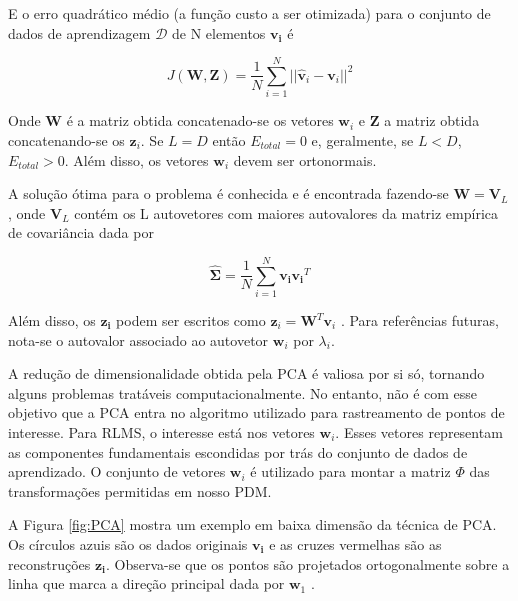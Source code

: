 {E o erro quadrático médio (a função custo a ser otimizada) para o conjunto de dados de aprendizagem $\mathcal{D}$ de N elementos $\mathbf{v_i}$ é

\begin{equation}
J(\mathbf{W}, \mathbf{Z} ) = \frac{1}{N}\sum_{i=1}^N ||\mathbf{\hat{v}}_{i} - \mathbf{v}_i||^2
\end{equation}

Onde $\mathbf{W}$ é a matriz obtida concatenado-se os vetores $\mathbf{w}_i$ e $\mathbf{Z}$ a matriz obtida concatenando-se os $\mathbf{z}_i$. Se $L = D$ então $E_{total} = 0$ e, geralmente, se $L < D$, $E_{total} > 0$.  Além disso, os vetores $\mathbf{w}_i$ devem ser ortonormais.

A solução ótima para o problema é conhecida e é encontrada fazendo-se $\mathbf{W} = \mathbf{V}_L$, onde $\mathbf{V}_L$ contém os L autovetores com maiores autovalores da matriz empírica de covariância dada por 

\begin{equation}
\hat{\mathbf{\Sigma}} = \frac{1}{N}\sum_{i=1}^{N} \mathbf{v_i}\mathbf{v_i}^T
\end{equation}

Além disso, os $\mathbf{z_i}$ podem ser escritos como $\mathbf{z}_i = \mathbf{W}^T \mathbf{v}_i$ \cite{machine-learning-book}. Para referências futuras, nota-se o autovalor associado ao autovetor $\mathbf{w}_i$ por $\lambda_i$.

A redução de dimensionalidade obtida pela PCA é valiosa por si só, tornando
alguns problemas tratáveis computacionalmente. No entanto, não é com esse
objetivo que a PCA entra no algoritmo utilizado para rastreamento de pontos de
interesse. Para  RLMS, o interesse está nos vetores $\mathbf{w}_i$. Esses vetores representam as componentes
fundamentais escondidas por trás do conjunto de dados de aprendizado. O conjunto
de vetores $\mathbf{w}_i$ é utilizado para montar a matriz $\Phi$ das transformações
permitidas em nosso PDM.

A Figura \ref{fig:PCA} mostra um exemplo em baixa dimensão da técnica de PCA. Os círculos azuis são os dados originais $\mathbf{v_i}$ e as cruzes vermelhas são as reconstruções $\mathbf{z_i}$. Observa-se que os pontos são projetados ortogonalmente sobre a linha que marca a direção principal dada por $\mathbf{w}_1$ \cite{machine-learning-book}.


}
